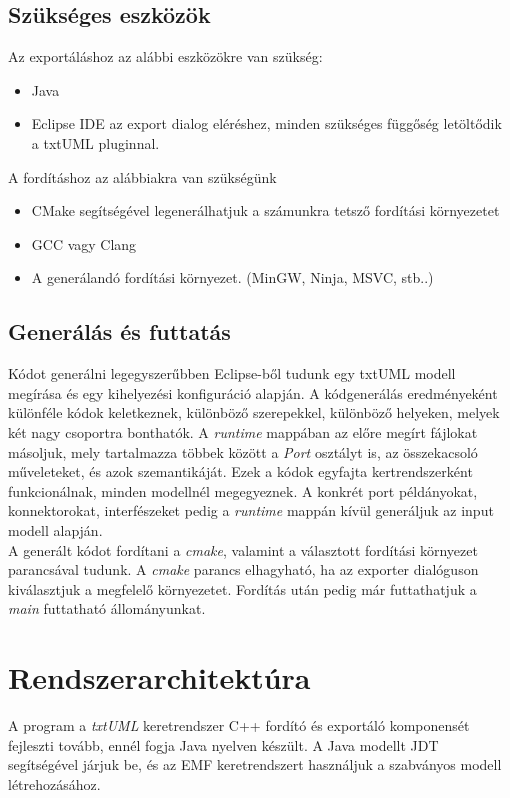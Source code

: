 \documentclass[a4paper,12pt]{report}
\begin{document}
\subsection{Szükséges eszközök}
Az exportáláshoz az alábbi eszközökre van szükség:
\begin{itemize}
\item Java
\item Eclipse IDE az export dialog eléréshez, minden szükséges függőség letöltődik a txtUML pluginnal.
\end{itemize}

A fordításhoz az alábbiakra van szükségünk
\begin{itemize}
\item CMake segítségével legenerálhatjuk a számunkra tetsző fordítási környezetet
\item GCC vagy Clang
\item A generálandó fordítási környezet. (MinGW, Ninja, MSVC, stb..)
\end{itemize}

\subsection{Generálás és futtatás}
Kódot generálni legegyszerűbben Eclipse-ből tudunk egy txtUML modell megírása és egy kihelyezési konfiguráció alapján. A kódgenerálás eredményeként különféle kódok keletkeznek, különböző szerepekkel, különböző helyeken, melyek két nagy csoportra bonthatók.  A \textit{runtime} mappában az előre megírt fájlokat másoljuk, mely tartalmazza többek között a \textit{Port} osztályt is, az összekacsoló műveleteket, és azok szemantikáját. Ezek a kódok egyfajta kertrendszerként funkcionálnak, minden modellnél megegyeznek. A konkrét port példányokat, konnektorokat, interfészeket pedig a \textit{runtime} mappán kívül generáljuk az input modell alapján. \\

A generált kódot fordítani a \textit{cmake}, valamint a választott fordítási környezet parancsával tudunk. A \textit{cmake} parancs elhagyható, ha az exporter dialóguson kiválasztjuk a megfelelő környezetet. Fordítás után pedig már futtathatjuk a \textit{main} futtatható állományunkat.

\section{Rendszerarchitektúra}
A program a \textit{txtUML} keretrendszer C++ fordító és exportáló komponensét fejleszti tovább, ennél fogja Java nyelven készült. A Java modellt JDT segítségével járjuk be, és az EMF keretrendszert használjuk a szabványos modell létrehozásához. \\
\end{document}
